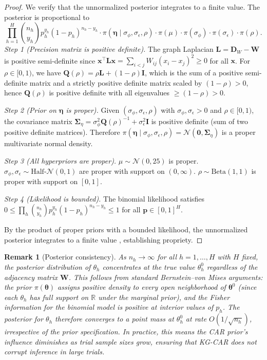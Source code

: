 \documentclass[12pt]{article}
\newtheorem{remark}{Remark}
\newcommand{\btheta}{\boldsymbol{\theta}}
\newcommand{\bW}{\mathbf{W}}
\newcommand{\bL}{\mathbf{L}}
\newcommand{\bD}{\mathbf{D}}
\newcommand{\bI}{\mathbf{I}}
\newcommand{\bQ}{\mathbf{Q}}
\newcommand{\Real}{\mathbb{R}}
\begin{document}
\begin{proof}
We verify that the unnormalized posterior integrates to a finite value. The posterior is proportional to
\[
\prod_{h=1}^{H} \binom{n_h}{y_h} p_h^{y_h}(1-p_h)^{n_h - y_h} \cdot \pi(\boldsymbol{\eta} \mid \sigma_\phi, \sigma_\epsilon, \rho) \cdot \pi(\mu) \cdot \pi(\sigma_\phi) \cdot \pi(\sigma_\epsilon) \cdot \pi(\rho).
\]
\textit{Step 1 (Precision matrix is positive definite).} The graph Laplacian $\bL = \bD_W - \bW$ is positive semi-definite since $\mathbf{x}^\top \bL \mathbf{x} = \sum_{i < j} W_{ij}(x_i - x_j)^2 \geq 0$ for all $\mathbf{x}$. For $\rho \in [0,1)$, we have $\bQ(\rho) = \rho \bL + (1-\rho)\bI$, which is the sum of a positive semi-definite matrix and a strictly positive definite matrix scaled by $(1-\rho) > 0$, hence $\bQ(\rho)$ is positive definite with all eigenvalues $\geq (1-\rho) > 0$.

\textit{Step 2 (Prior on $\boldsymbol{\eta}$ is proper).} Given $(\sigma_\phi, \sigma_\epsilon, \rho)$ with $\sigma_\phi, \sigma_\epsilon > 0$ and $\rho \in [0,1)$, the covariance matrix $\boldsymbol{\Sigma}_\eta = \sigma_\phi^2 \bQ(\rho)^{-1} + \sigma_\epsilon^2 \bI$ is positive definite (sum of two positive definite matrices). Therefore $\pi(\boldsymbol{\eta} \mid \sigma_\phi, \sigma_\epsilon, \rho) = \mathcal{N}(\mathbf{0}, \boldsymbol{\Sigma}_\eta)$ is a proper multivariate normal density.

\textit{Step 3 (All hyperpriors are proper).} $\mu \sim \mathcal{N}(0, 25)$ is proper. $\sigma_\phi, \sigma_\epsilon \sim \text{Half-}\mathcal{N}(0,1)$ are proper with support on $(0, \infty)$. $\rho \sim \text{Beta}(1,1)$ is proper with support on $[0,1]$.

\textit{Step 4 (Likelihood is bounded).} The binomial likelihood satisfies $0 \leq \prod_h \binom{n_h}{y_h} p_h^{y_h}(1-p_h)^{n_h-y_h} \leq 1$ for all $\mathbf{p} \in [0,1]^H$.

By the product of proper priors with a bounded likelihood, the unnormalized posterior integrates to a finite value \citep[cf.][Chapter~3]{rue2005gaussian}, establishing propriety.
\end{proof}

\begin{remark}[Posterior consistency]
\label{rem:consistency}
As $n_h \to \infty$ for all $h = 1, \ldots, H$ with $H$ fixed, the posterior distribution of $\theta_h$ concentrates at the true value $\theta_h^0$ regardless of the adjacency matrix $\bW$. This follows from standard Bernstein--von Mises arguments: the prior $\pi(\btheta)$ assigns positive density to every open neighborhood of $\btheta^0$ (since each $\theta_h$ has full support on $\Real$ under the marginal prior), and the Fisher information for the binomial model is positive at interior values of $p_h$. The posterior for $\theta_h$ therefore converges to a point mass at $\theta_h^0$ at rate $O(1/\sqrt{n_h})$, irrespective of the prior specification. In practice, this means the CAR prior's influence diminishes as trial sample sizes grow, ensuring that KG-CAR does not corrupt inference in large trials.
\end{remark}
\end{document}
